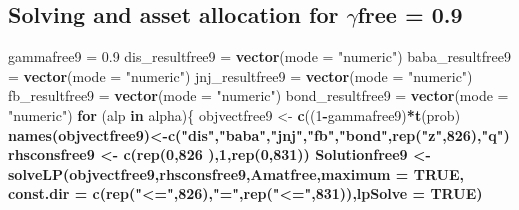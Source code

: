 \documentclass[]{article}
\newenvironment{Shaded}{\begin{snugshade}}{\end{snugshade}}
\newcommand{\KeywordTok}[1]{\textcolor[rgb]{0.13,0.29,0.53}{\textbf{#1}}}
\newcommand{\DataTypeTok}[1]{\textcolor[rgb]{0.13,0.29,0.53}{#1}}
\newcommand{\DecValTok}[1]{\textcolor[rgb]{0.00,0.00,0.81}{#1}}
\newcommand{\FloatTok}[1]{\textcolor[rgb]{0.00,0.00,0.81}{#1}}
\newcommand{\StringTok}[1]{\textcolor[rgb]{0.31,0.60,0.02}{#1}}
\newcommand{\OtherTok}[1]{\textcolor[rgb]{0.56,0.35,0.01}{#1}}
\newcommand{\ControlFlowTok}[1]{\textcolor[rgb]{0.13,0.29,0.53}{\textbf{#1}}}
\newcommand{\OperatorTok}[1]{\textcolor[rgb]{0.81,0.36,0.00}{\textbf{#1}}}
\newcommand{\NormalTok}[1]{#1}
\begin{document}
\subsection{\texorpdfstring{Solving and asset allocation for
\(\gamma\)free =
0.9}{Solving and asset allocation for \textbackslash{}gammafree = 0.9}}\label{solving-and-asset-allocation-for-gammafree-0.9}

\begin{Shaded}
\begin{Highlighting}[]
\NormalTok{gammafree9 =}\StringTok{ }\FloatTok{0.9}
\NormalTok{dis_resultfree9 =}\StringTok{ }\KeywordTok{vector}\NormalTok{(}\DataTypeTok{mode =} \StringTok{"numeric"}\NormalTok{)}
\NormalTok{baba_resultfree9 =}\StringTok{ }\KeywordTok{vector}\NormalTok{(}\DataTypeTok{mode =} \StringTok{"numeric"}\NormalTok{)}
\NormalTok{jnj_resultfree9 =}\StringTok{ }\KeywordTok{vector}\NormalTok{(}\DataTypeTok{mode =} \StringTok{"numeric"}\NormalTok{)}
\NormalTok{fb_resultfree9 =}\StringTok{ }\KeywordTok{vector}\NormalTok{(}\DataTypeTok{mode =} \StringTok{"numeric"}\NormalTok{)}
\NormalTok{bond_resultfree9 =}\StringTok{ }\KeywordTok{vector}\NormalTok{(}\DataTypeTok{mode =} \StringTok{"numeric"}\NormalTok{)}
\ControlFlowTok{for}\NormalTok{ (alp }\ControlFlowTok{in}\NormalTok{ alpha)\{}
\NormalTok{  objvectfree9 <-}\StringTok{ }\KeywordTok{c}\NormalTok{((}\DecValTok{1}\OperatorTok{-}\NormalTok{gammafree9)}\OperatorTok{*}\KeywordTok{t}\NormalTok{(prob)}\OperatorTok{%
  \KeywordTok{names}\NormalTok{(objvectfree9)<-}\KeywordTok{c}\NormalTok{(}\StringTok{"dis"}\NormalTok{,}\StringTok{"baba"}\NormalTok{,}\StringTok{"jnj"}\NormalTok{,}\StringTok{"fb"}\NormalTok{,}\StringTok{"bond"}\NormalTok{,}\KeywordTok{rep}\NormalTok{(}\StringTok{"z"}\NormalTok{,}\DecValTok{826}\NormalTok{),}\StringTok{"q"}\NormalTok{) }
\NormalTok{  rhsconsfree9 <-}\StringTok{ }\KeywordTok{c}\NormalTok{(}\KeywordTok{rep}\NormalTok{(}\DecValTok{0}\NormalTok{,}\DecValTok{826}\NormalTok{ ),}\DecValTok{1}\NormalTok{,}\KeywordTok{rep}\NormalTok{(}\DecValTok{0}\NormalTok{,}\DecValTok{831}\NormalTok{))}
\NormalTok{  Solutionfree9 <-}\StringTok{ }\KeywordTok{solveLP}\NormalTok{(objvectfree9,rhsconsfree9,Amatfree,}\DataTypeTok{maximum =} \OtherTok{TRUE}\NormalTok{,}
          \DataTypeTok{const.dir =} \KeywordTok{c}\NormalTok{(}\KeywordTok{rep}\NormalTok{(}\StringTok{"<="}\NormalTok{,}\DecValTok{826}\NormalTok{),}\StringTok{"="}\NormalTok{,}\KeywordTok{rep}\NormalTok{(}\StringTok{"<="}\NormalTok{,}\DecValTok{831}\NormalTok{)),}\DataTypeTok{lpSolve =} \OtherTok{TRUE}\NormalTok{)}
}
\end{Highlighting}
\end{Shaded}
\end{document}
